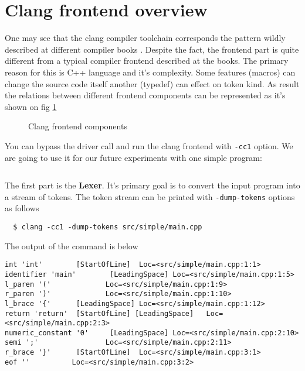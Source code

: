 \section{Clang frontend overview}
One may see that the clang compiler toolchain corresponds the pattern
wildly described at different compiler books
\cite{book:engineering_a_compiler}. Despite the fact, the frontend
part is quite different from a typical compiler frontend described at
the books. The primary reason for this is C++ language and it's
complexity. Some features (macros) can change the source code itself
another (typedef) can effect on token kind. As result the relations
between different frontend components can be represented as it's shown
on fig \ref{fig:clang_frontend}
\begin{figure}
\begin{center}
\end{center}
  \caption{Clang frontend components}
  \label{fig:clang_frontend}
\end{figure}

You can bypass the driver call and run the clang frontend  with
\texttt{-cc1} option. We are going to use it for our future
experiments with one simple program:
\inputminted{c++}{./src/simple/main.cpp}

The first part is the \textbf{Lexer}. It's primary goal is to convert the input
program into a stream of tokens. The token stream can be printed with
\texttt{-dump-tokens} options as follows
\begin{verbatim}
  $ clang -cc1 -dump-tokens src/simple/main.cpp
\end{verbatim}
The output of the command is below
\begin{verbatim}
int 'int'        [StartOfLine]  Loc=<src/simple/main.cpp:1:1>
identifier 'main'        [LeadingSpace] Loc=<src/simple/main.cpp:1:5>
l_paren '('             Loc=<src/simple/main.cpp:1:9>
r_paren ')'             Loc=<src/simple/main.cpp:1:10>
l_brace '{'      [LeadingSpace] Loc=<src/simple/main.cpp:1:12>
return 'return'  [StartOfLine] [LeadingSpace]   Loc=<src/simple/main.cpp:2:3>
numeric_constant '0'     [LeadingSpace] Loc=<src/simple/main.cpp:2:10>
semi ';'                Loc=<src/simple/main.cpp:2:11>
r_brace '}'      [StartOfLine]  Loc=<src/simple/main.cpp:3:1>
eof ''          Loc=<src/simple/main.cpp:3:2>
\end{verbatim}

